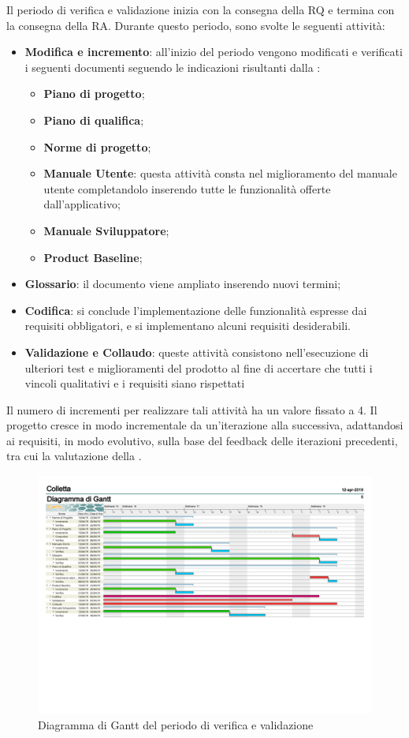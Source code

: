 Il periodo di verifica e validazione inizia con la consegna della RQ e termina con la consegna della RA.\newline
Durante questo periodo, sono svolte le seguenti attività:
\begin{itemize}
	\item \textbf{Modifica e incremento}: all'inizio  del  periodo  vengono  modificati  e  verificati  i seguenti documenti seguendo le indicazioni risultanti dalla \RQ{}:
	\begin{itemize}
		\item \textbf{Piano di progetto};
		\item \textbf{Piano di qualifica};
		\item \textbf{Norme di progetto};
		\item \textbf{Manuale Utente}: questa attività consta nel miglioramento del manuale utente completandolo inserendo tutte le funzionalità offerte dall'applicativo;
		\item \textbf{Manuale Sviluppatore};
		\item \textbf{Product Baseline};
	\end{itemize}
	\item \textbf{Glossario}: il documento viene ampliato inserendo nuovi termini;
	\item \textbf{Codifica}: si conclude l'implementazione delle funzionalità espresse dai requisiti obbligatori, e si implementano alcuni requisiti desiderabili.
	\item \textbf{Validazione e Collaudo}: queste attività consistono nell'esecuzione di ulteriori test e miglioramenti del prodotto al fine di accertare che tutti i vincoli qualitativi e i requisiti siano rispettati
\end{itemize}
Il numero di incrementi per realizzare tali attività ha un valore fissato a 4.
Il progetto cresce in modo incrementale da un'iterazione alla successiva, adattandosi ai requisiti, in modo evolutivo, sulla base del feedback delle iterazioni precedenti, tra cui la valutazione della \RQ{}.
\begin{figure}[H]
		\hspace*{-1.5cm}
	\includegraphics[width=19.4cm, height=8cm]{Pianificazione/verificaValidazione.pdf}
	\caption{Diagramma di Gantt del periodo di verifica e validazione}
\end{figure}